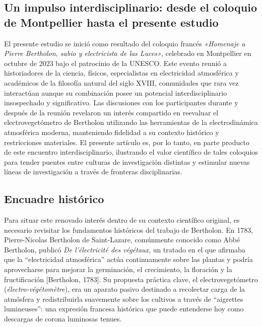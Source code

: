 \documentclass[
]{article}
\begin{document}
\subsection{Un impulso interdisciplinario: desde el coloquio de
Montpellier hasta el presente
estudio}\label{un-impulso-interdisciplinario-desde-el-coloquio-de-montpellier-hasta-el-presente-estudio}

El presente estudio se inició como resultado del coloquio francés
\emph{«Homenaje a Pierre Bertholon, sabio y electricista de las Luces»},
celebrado en Montpellier en octubre de 2023 bajo el patrocinio de la
UNESCO. Este evento reunió a historiadores de la ciencia, físicos,
especialistas en electricidad atmosférica y académicos de la filosofía
natural del siglo XVIII, comunidades que rara vez interactúan aunque su
combinación posee un potencial interdisciplinario insospechado y
significativo. Las discusiones con los participantes durante y después
de la reunión revelaron un interés compartido en reevaluar el
electrovegetómetro de Bertholon utilizando las herramientas de la
electrodinámica atmosférica moderna, manteniendo fidelidad a su contexto
histórico y restricciones materiales. El presente artículo es, por lo
tanto, en parte producto de este encuentro interdisciplinario,
ilustrando el valor científico de tales coloquios para tender puentes
entre culturas de investigación distintas y estimular nuevas líneas de
investigación a través de fronteras disciplinarias.

\subsection{Encuadre histórico}\label{encuadre-histuxf3rico}

Para situar este renovado interés dentro de su contexto científico
original, es necesario revisitar los fundamentos históricos del trabajo
de Bertholon. En 1783, Pierre-Nicolas Bertholon de Saint-Lazare,
comúnmente conocido como Abbé Bertholon, publicó \emph{De l'électricité
des végétaux}, un tratado en el que afirmaba que la ``electricidad
atmosférica'' actúa continuamente sobre las plantas y podría
aprovecharse para mejorar la germinación, el crecimiento, la floración y
la fructificación {[}Bertholon, 1783{]}. Su propuesta práctica clave, el
electrovegetómetro (\emph{électro-végétomètre}), era un aparato pasivo
destinado a recolectar carga de la atmósfera y redistribuirla suavemente
sobre los cultivos a través de ``aigrettes lumineuses'': una expresión
francesa histórica que puede entenderse hoy como descargas de corona
luminosas tenues.
\end{document}
